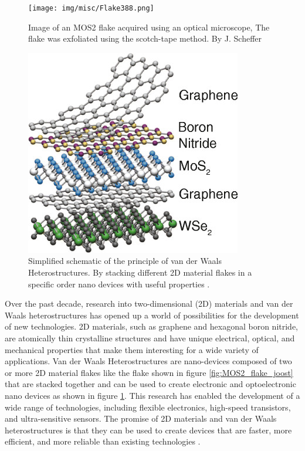 \documentclass[10pt]{article}
\begin{document}
\begin{figure}[H]
  \centering
  \begin{minipage}[b]{0.58\textwidth}
    \texttt{[image: img/misc/Flake388.png]}
    \caption{Image of an MOS2 flake acquired using an optical microscope, The flake was exfoliated using the scotch-tape method. By J. Scheffer}
    \label{fig:MOS2_flake_joost}
  \end{minipage}
  \hfill
  \begin{minipage}[b]{0.38\textwidth}
    \includegraphics[width=\textwidth]{img/misc/vdws_example.png}
    \caption{Simplified schematic of the principle of van der Waals Heterostructures. By stacking different 2D material flakes in a specific order nano devices with useful properties \cite{jungSurfaceEffectsElectronic2014, geimVanWaalsHeterostructures2013}.}
    \label{fig:heterostack_schematic}
  \end{minipage}
\end{figure}

Over the past decade, research into two-dimensional (2D) materials and van der Waals heterostructures has opened up a world of possibilities for the development of new technologies. 2D materials, such as graphene and hexagonal boron nitride, are atomically thin crystalline structures and have unique electrical, optical, and mechanical properties that make them interesting for a wide variety of applications.
Van der Waals Heterostructures are nano-devices composed of two or more 2D material flakes like the flake shown in figure \ref{fig:MOS2_flake_joost} that are stacked together and can be used to create electronic and optoelectronic nano devices as shown in figure \ref{fig:heterostack_schematic}.
This research has enabled the development of a wide range of technologies, including flexible electronics, high-speed transistors, and ultra-sensitive sensors. 
The promise of 2D materials and van der Waals heterostructures is that they can be used to create devices that are faster, more efficient, and more reliable than existing technologies \cite{geimVanWaalsHeterostructures2013}.
\end{document}
